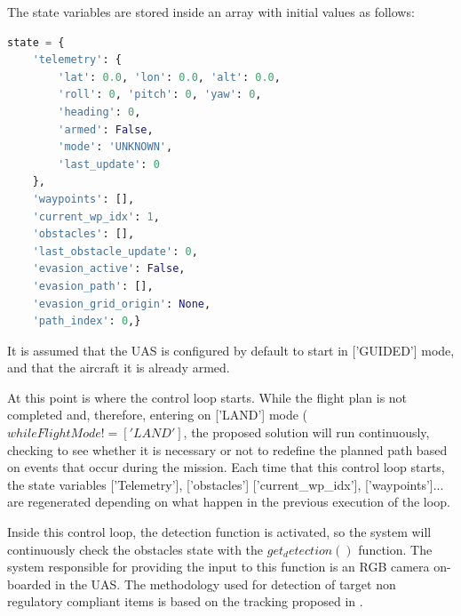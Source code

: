 \documentclass[a4paper, 11pt]{article}
\begin{document}
The state variables are stored inside an array with initial values as follows: 
\begin{lstlisting}[language=Python]
state = {
    'telemetry': {
        'lat': 0.0, 'lon': 0.0, 'alt': 0.0,
        'roll': 0, 'pitch': 0, 'yaw': 0,
        'heading': 0,
        'armed': False,
        'mode': 'UNKNOWN',
        'last_update': 0
    },
    'waypoints': [],
    'current_wp_idx': 1,
    'obstacles': [],
    'last_obstacle_update': 0,
    'evasion_active': False,
    'evasion_path': [],
    'evasion_grid_origin': None, 
    'path_index': 0,}
\end{lstlisting}
It is assumed that the UAS is configured by default to start in ['GUIDED'] mode, and that the aircraft it is already armed. 

At this point is where the control loop starts. While the flight plan is not completed and, therefore, entering on ['LAND'] mode ($while FlightMode != ['LAND']$, the proposed solution will run continuously, checking to see whether it is necessary or not to redefine the planned path based on events that occur during the mission. 
Each time that this control loop starts, the state variables ['Telemetry'], ['obstacles'] ['current_wp_idx'], ['waypoints']... are regenerated depending on what happen in the previous execution of the loop. %





Inside this control loop, the detection function is activated, so the system will continuously check the obstacles state with the $get_detection()$ function. The system responsible for providing the input to this function is an RGB camera on-boarded in the UAS. The methodology used for detection of target non regulatory compliant items is based on the tracking proposed in \cite{alaez2023real}.
\end{document}
